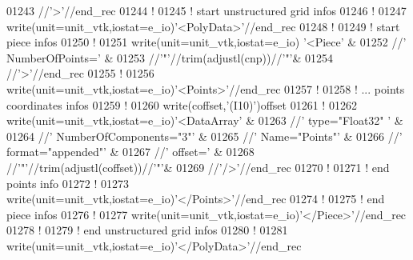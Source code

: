 \begin{DoxyCode}
01243                                 //\textcolor{stringliteral}{'>'}//end\_rec
01244 \textcolor{comment}{!}
01245 \textcolor{comment}{! start unstructured grid infos}
01246 \textcolor{comment}{!}
01247 \textcolor{keyword}{write}(unit=unit\_vtk,iostat=e\_io)\textcolor{stringliteral}{'<PolyData>'}//end\_rec
01248 \textcolor{comment}{!}
01249 \textcolor{comment}{! start piece infos}
01250 \textcolor{comment}{!}
01251 \textcolor{keyword}{write}(unit=unit\_vtk,iostat=e\_io)  \textcolor{stringliteral}{'<Piece'}                    &
01252                                 //\textcolor{stringliteral}{' NumberOfPoints='}          &
01253                                 //\textcolor{stringliteral}{'"'}//trim(adjustl(cnp))//\textcolor{stringliteral}{'"'}&
01254                                 //\textcolor{stringliteral}{'>'}//end\_rec
01255 \textcolor{comment}{!}
01256 \textcolor{keyword}{write}(unit=unit\_vtk,iostat=e\_io)\textcolor{stringliteral}{'<Points>'}//end\_rec
01257 \textcolor{comment}{!}
01258 \textcolor{comment}{! ... points coordinates infos}
01259 \textcolor{comment}{!}
01260 \textcolor{keyword}{write}(coffset,\textcolor{stringliteral}{'(I10)'})offset
01261 \textcolor{comment}{!}
01262 \textcolor{keyword}{write}(unit=unit\_vtk,iostat=e\_io)\textcolor{stringliteral}{'<DataArray'}                      &
01263                                 //\textcolor{stringliteral}{' type="Float32" '}              &
01264                                 //\textcolor{stringliteral}{' NumberOfComponents="3"'}       &
01265                                 //\textcolor{stringliteral}{' Name="Points"'}                &
01266                                 //\textcolor{stringliteral}{' format="appended"'}            &
01267                                 //\textcolor{stringliteral}{' offset='}                      &
01268                                 //\textcolor{stringliteral}{'"'}//trim(adjustl(coffset))//\textcolor{stringliteral}{'"'}&
01269                                 //\textcolor{stringliteral}{'/>'}//end\_rec
01270 \textcolor{comment}{!}
01271 \textcolor{comment}{! end points info}
01272 \textcolor{comment}{!}
01273 \textcolor{keyword}{write}(unit=unit\_vtk,iostat=e\_io)\textcolor{stringliteral}{'</Points>'}//end\_rec
01274 \textcolor{comment}{!}
01275 \textcolor{comment}{! end piece infos}
01276 \textcolor{comment}{!}
01277 \textcolor{keyword}{write}(unit=unit\_vtk,iostat=e\_io)\textcolor{stringliteral}{'</Piece>'}//end\_rec
01278 \textcolor{comment}{!}
01279 \textcolor{comment}{! end unstructured grid infos}
01280 \textcolor{comment}{!}
01281 \textcolor{keyword}{write}(unit=unit\_vtk,iostat=e\_io)\textcolor{stringliteral}{'</PolyData>'}//end\_rec

\end{DoxyCode}
